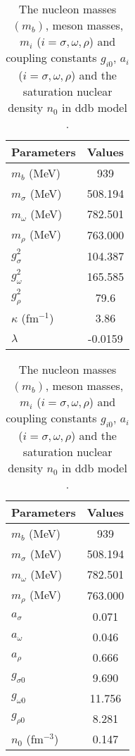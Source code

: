 \documentclass[a4paper, 11pt]{article}
\begin{document}
\begin{table}
\parbox{.45\linewidth}{
\centering
\caption{The nucleon masses $(m_b)$, $\sigma$ meson mass $(m_{\sigma})$, $\omega$ meson mass $(m_{\omega})$, $\rho$ meson mass $(m_{\rho})$ and couplings $g_{\sigma}$, $g_{\omega}$, $g_{\rho}$, $\kappa$,  $\lambda$ in NL3 parameterisation \cite{Tolos:2016}.}
\centering
\begin{tabular}{@{} lc @{}}
\hline\hline
{\bf Parameters} & {\bf Values} \\ [0.1 ex]
\hline
$m_b$ (MeV)        & 939    \\
$m_{\sigma}$ (MeV) & 508.194\\
$m_{\omega}$ (MeV) & 782.501\\
$m_{\rho}$ (MeV) & 763.000\\
$g_{\sigma}^2$   & 104.387 \\
$g_{\omega}^2$   & 165.585 \\
$g_{\rho}^2$     & 79.6  \\
$\kappa$ (fm$^{-1}$) & 3.86\\
$\lambda$            & -0.0159\\
\hline
\end{tabular}
\label{table.nl3.parameters}
\vspace{1cm}
}
\hfill
\parbox{.45\linewidth}{
\centering
\caption{The nucleon masses $(m_b)$, meson masses, $m_{i}$ ($i=\sigma, \omega, \rho$) and coupling constants $g_{i0}$, $a_{i}$ ($i=\sigma, \omega, \rho$) and the saturation nuclear density $n_0$ in \ac{ddb} model \cite{Malik:2022jqc,Malik:2022aas}.}
\centering
\begin{tabular}{@{} lc @{}}
\hline\hline
{\bf Parameters} & {\bf Values} \\ [0.1 ex]
\hline
$m_b$ (MeV)        & 939    \\
$m_{\sigma}$ (MeV) & 508.194\\
$m_{\omega}$ (MeV) & 782.501\\
$m_{\rho}$   (MeV) & 763.000\\
$a_{\sigma}$   & 0.071 \\
$a_{\omega}$   & 0.046  \\
$a_{\rho}$     & 0.666 \\
$g_{\sigma 0}$   & 9.690 \\
$g_{\omega 0}$   & 11.756\\
$g_{\rho 0}$     & 8.281 \\
$n_0$ (fm$^{-3}$) & 0.147\\
\hline
\end{tabular}
\label{table.ddb.parameters}
}
\end{table}
\end{document}
